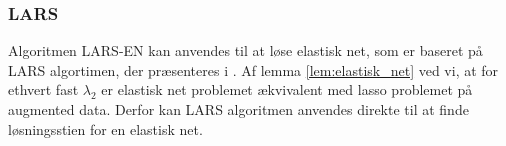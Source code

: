 \subsubsection{LARS}
Algoritmen LARS-EN kan anvendes til at løse elastisk net, som er baseret på LARS algortimen, der præsenteres i \cite{efron}.
Af lemma \ref{lem:elastisk_net} ved vi, at for ethvert fast \(\lambda_2\) er elastisk net problemet ækvivalent med lasso problemet på augmented data.
Derfor kan LARS algoritmen anvendes direkte til at finde løsningsstien for en elastisk net.

%
%
%
%
